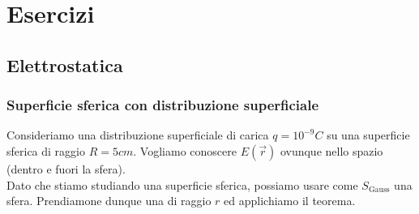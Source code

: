 \documentclass[a4paper,12pt,titlepage,openany]{book}
\theoremstyle{mydef}
\begin{document}
    \appendix
    \chapter{Esercizi}
    \section{Elettrostatica}
        \subsection{Superficie sferica con distribuzione superficiale}
            \begin{figure}
            \end{figure}
            Consideriamo una distribuzione superficiale di carica $q=10^{-9}C$ su una superficie sferica di raggio $R=5cm$.
            Vogliamo conoscere $E(\vec{r})$ ovunque nello spazio (dentro e fuori la sfera).\\[3em]
            
            Dato che stiamo studiando una superficie sferica, possiamo usare come $S_{\text{Gauss}}$ una sfera. Prendiamone dunque una
            di raggio $r$ ed applichiamo il teorema.

    
\end{document}
